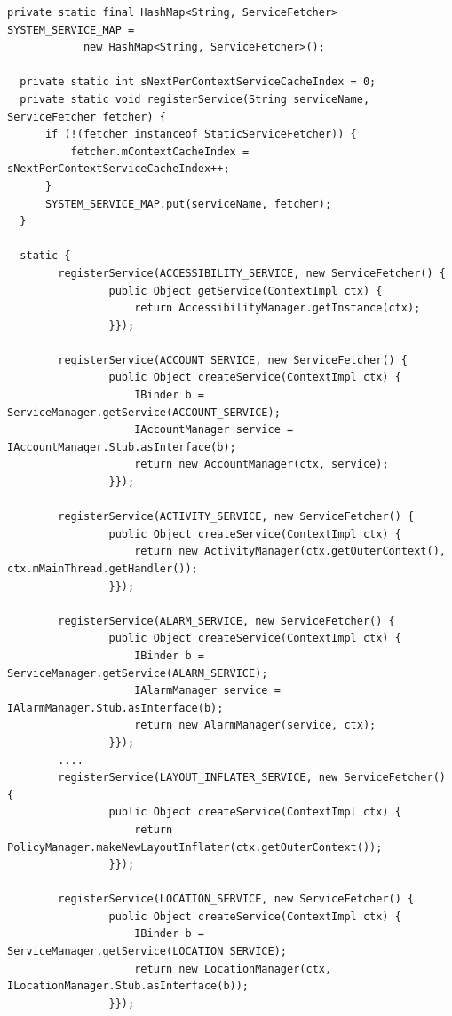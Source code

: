 \begin{lstlisting}[frame=single, caption=ContextImpl.java] 
  private static final HashMap<String, ServiceFetcher> SYSTEM_SERVICE_MAP =
            new HashMap<String, ServiceFetcher>();

  private static int sNextPerContextServiceCacheIndex = 0;
  private static void registerService(String serviceName, ServiceFetcher fetcher) {
      if (!(fetcher instanceof StaticServiceFetcher)) {
          fetcher.mContextCacheIndex = sNextPerContextServiceCacheIndex++;
      }
      SYSTEM_SERVICE_MAP.put(serviceName, fetcher);
  }
    
  static {
        registerService(ACCESSIBILITY_SERVICE, new ServiceFetcher() {
                public Object getService(ContextImpl ctx) {
                    return AccessibilityManager.getInstance(ctx);
                }});

        registerService(ACCOUNT_SERVICE, new ServiceFetcher() {
                public Object createService(ContextImpl ctx) {
                    IBinder b = ServiceManager.getService(ACCOUNT_SERVICE);
                    IAccountManager service = IAccountManager.Stub.asInterface(b);
                    return new AccountManager(ctx, service);
                }});

        registerService(ACTIVITY_SERVICE, new ServiceFetcher() {
                public Object createService(ContextImpl ctx) {
                    return new ActivityManager(ctx.getOuterContext(), ctx.mMainThread.getHandler());
                }});

        registerService(ALARM_SERVICE, new ServiceFetcher() {
                public Object createService(ContextImpl ctx) {
                    IBinder b = ServiceManager.getService(ALARM_SERVICE);
                    IAlarmManager service = IAlarmManager.Stub.asInterface(b);
                    return new AlarmManager(service, ctx);
                }});
		....
        registerService(LAYOUT_INFLATER_SERVICE, new ServiceFetcher() {
                public Object createService(ContextImpl ctx) {
                    return PolicyManager.makeNewLayoutInflater(ctx.getOuterContext());
                }});

        registerService(LOCATION_SERVICE, new ServiceFetcher() {
                public Object createService(ContextImpl ctx) {
                    IBinder b = ServiceManager.getService(LOCATION_SERVICE);
                    return new LocationManager(ctx, ILocationManager.Stub.asInterface(b));
                }});


\end{lstlisting}
